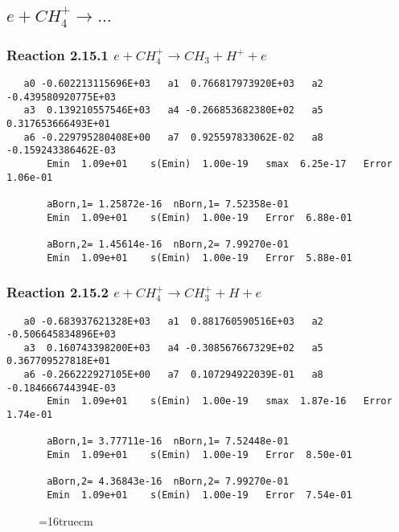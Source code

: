\documentclass[12pt]{article}
\begin{document}
\subsection{
$e + CH_4^+ \rightarrow ... $
}

\subsubsection{
Reaction 2.15.1    $e + CH_4^+ \rightarrow CH_3 + H^+ + e$
}

\begin{small}\begin{verbatim} 
   a0 -0.602213115696E+03   a1  0.766817973920E+03   a2 -0.439580920775E+03
   a3  0.139210557546E+03   a4 -0.266853682380E+02   a5  0.317653666493E+01
   a6 -0.229795280408E+00   a7  0.925597833062E-02   a8 -0.159243386462E-03
       Emin  1.09e+01    s(Emin)  1.00e-19   smax  6.25e-17   Error  1.06e-01
 
       aBorn,1= 1.25872e-16  nBorn,1= 7.52358e-01
       Emin  1.09e+01    s(Emin)  1.00e-19   Error  6.88e-01
 
       aBorn,2= 1.45614e-16  nBorn,2= 7.99270e-01
       Emin  1.09e+01    s(Emin)  1.00e-19   Error  5.88e-01
\end{verbatim}\end{small}

\subsubsection{
Reaction 2.15.2    $e + CH_4^+ \rightarrow CH_3^+ + H + e$
}

\begin{small}\begin{verbatim} 
   a0 -0.683937621328E+03   a1  0.881760590516E+03   a2 -0.506645834896E+03
   a3  0.160743398200E+03   a4 -0.308567667329E+02   a5  0.367709527818E+01
   a6 -0.266222927105E+00   a7  0.107294922039E-01   a8 -0.184666744394E-03
       Emin  1.09e+01    s(Emin)  1.00e-19   smax  1.87e-16   Error  1.74e-01
 
       aBorn,1= 3.77711e-16  nBorn,1= 7.52448e-01
       Emin  1.09e+01    s(Emin)  1.00e-19   Error  8.50e-01
 
       aBorn,2= 4.36843e-16  nBorn,2= 7.99270e-01
       Emin  1.09e+01    s(Emin)  1.00e-19   Error  7.54e-01
\end{verbatim}\end{small}

\begin{figure} \label{met.1_2.15}
\epsfxsize=16truecm
\end{figure}
\newpage
\end{document}

